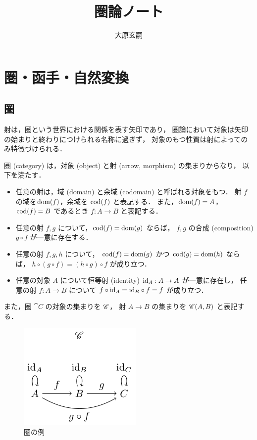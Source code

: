 \documentclass[titlepage]{ltjsreport}
\title{圏論ノート}
\author{大原玄嗣}
\newtheorem[S]{theorem}{定理}[chapter]
\newtheorem[S]{definition}[theorem]{定義}
\newtheorem[S]{example}[theorem]{例}
\begin{document}
\maketitle

\chapter{圏・函手・自然変換}

\section{圏}

射は，圏という世界における関係を表す矢印であり，
圏論において対象は矢印の始まりと終わりにつけられる名称に過ぎず，
対象のもつ性質は射によってのみ特徴づけられる．

\begin{definition}[圏]\label{def:category}
  圏 (category) は，対象 (object) と射 (arrow, morphism) の集まりからなり，
  以下を満たす．
  \begin{itemize}
    \item 任意の射は，域 (domain) と余域 (codomain) と呼ばれる対象をもつ．
          射 $f$ の域を$\operatorname{dom}(f)$，余域を $\operatorname{cod}(f)$ と表記する．
          また，$\operatorname{dom}(f)=A$，$\operatorname{cod}(f)=B$ であるとき $f:A\to B$ と表記する．
    \item 任意の射 $f,g$ について，$\operatorname{cod}(f)=\operatorname{dom}(g)$ ならば，
          $f,g$ の合成 (composition) $g\circ f$ が一意に存在する．
    \item 任意の射 $f,g,h$ について，
          $\operatorname{cod}(f)=\operatorname{dom}(g)$ かつ $\operatorname{cod}(g)=\operatorname{dom}(h)$ ならば，
          $h\circ(g\circ f)=(h\circ g)\circ f$ が成り立つ．
    \item 任意の対象 $A$ について恒等射 (identity) $\mathrm{id}_{A}:A\to A$ が一意に存在し，
          任意の射 $f:A\to B$ について $f\circ \mathrm{id}_{A}=\mathrm{id}_{B}\circ f=f$ が成り立つ．
  \end{itemize}
  また，圏 $\cat{C}$ の対象の集まりを $\mathscr{C}$，
  射 $A\to B$ の集まりを $\mathscr{C}(A,B)$ と表記する．
\end{definition}

\begin{figure}[htbp]
  \centering
  \includegraphics{src/category}
  \caption{圏の例}
\end{figure}
\end{document}
